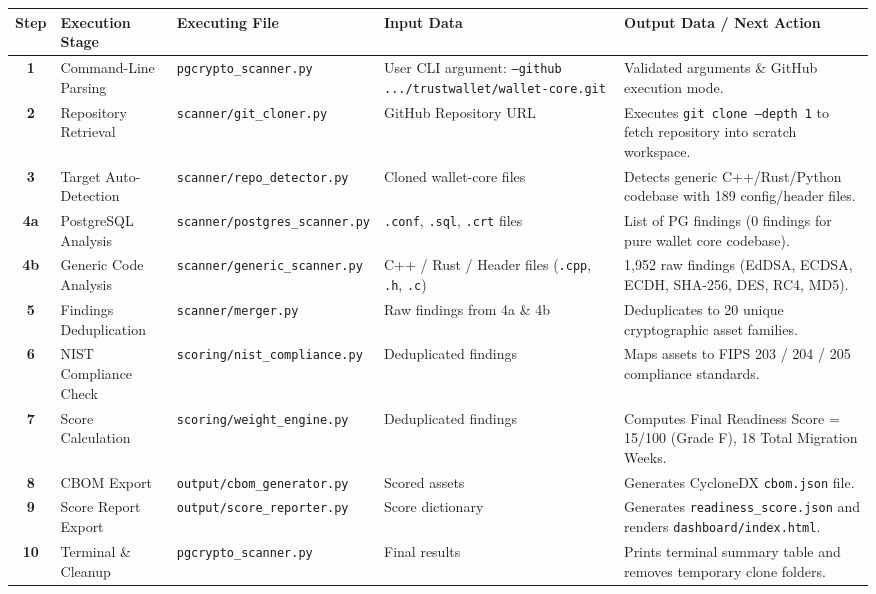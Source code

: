 \documentclass[11pt,a4paper,landscape]{article}
\begin{document}
{\small
\begin{tabularx}{\linewidth}{c l l X X}
\toprule
\textbf{Step} & \textbf{Execution Stage} & \textbf{Executing File} & \textbf{Input Data} & \textbf{Output Data / Next Action} \\
\midrule
\textbf{1} & Command-Line Parsing & \texttt{pgcrypto\_scanner.py} & User CLI argument: \texttt{--github .../trustwallet/wallet-core.git} & Validated arguments \& GitHub execution mode. \\
\textbf{2} & Repository Retrieval & \texttt{scanner/git\_cloner.py} & GitHub Repository URL & Executes \texttt{git clone --depth 1} to fetch repository into scratch workspace. \\
\textbf{3} & Target Auto-Detection & \texttt{scanner/repo\_detector.py} & Cloned wallet-core files & Detects generic C++/Rust/Python codebase with 189 config/header files. \\
\textbf{4a} & PostgreSQL Analysis & \texttt{scanner/postgres_scanner.py} & \texttt{.conf}, \texttt{.sql}, \texttt{.crt} files & List of PG findings (0 findings for pure wallet core codebase). \\
\textbf{4b} & Generic Code Analysis & \texttt{scanner/generic_scanner.py} & C++ / Rust / Header files (\texttt{.cpp}, \texttt{.h}, \texttt{.c}) & 1,952 raw findings (EdDSA, ECDSA, ECDH, SHA-256, DES, RC4, MD5). \\
\textbf{5} & Findings Deduplication & \texttt{scanner/merger.py} & Raw findings from 4a \& 4b & Deduplicates to 20 unique cryptographic asset families. \\
\textbf{6} & NIST Compliance Check & \texttt{scoring/nist_compliance.py} & Deduplicated findings & Maps assets to FIPS 203 / 204 / 205 compliance standards. \\
\textbf{7} & Score Calculation & \texttt{scoring/weight_engine.py} & Deduplicated findings & Computes Final Readiness Score = 15/100 (Grade F), 18 Total Migration Weeks. \\
\textbf{8} & CBOM Export & \texttt{output/cbom_generator.py} & Scored assets & Generates CycloneDX \texttt{cbom.json} file. \\
\textbf{9} & Score Report Export & \texttt{output/score_reporter.py} & Score dictionary & Generates \texttt{readiness\_score.json} and renders \texttt{dashboard/index.html}. \\
\textbf{10} & Terminal \& Cleanup & \texttt{pgcrypto\_scanner.py} & Final results & Prints terminal summary table and removes temporary clone folders. \\
\bottomrule
\end{tabularx}
}
\end{document}
